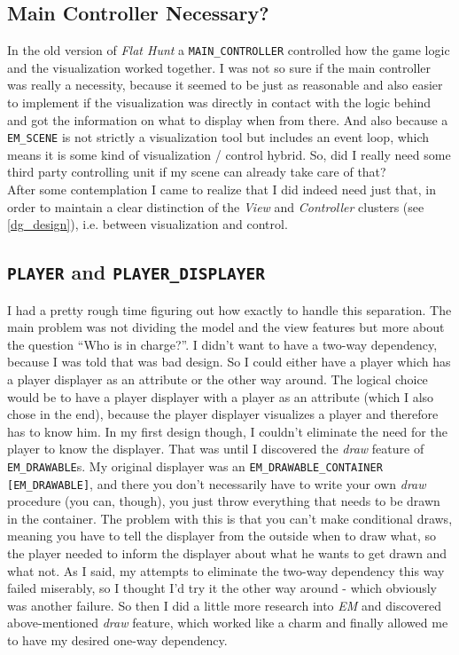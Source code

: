 \subsection{Main Controller Necessary?}
In the old version of \emph{Flat Hunt} a \texttt{MAIN\_CONTROLLER} controlled how the game logic and the visualization worked together. I was not so sure if the main controller was really a necessity, because it seemed to be just as reasonable and also easier to implement if the visualization was directly in contact with the logic behind and got the information on what to display when from there. And also because a \texttt{EM\_SCENE} is not strictly a visualization tool but includes an event loop, which means it is some kind of visualization / control hybrid. So, did I really need some third party controlling unit if my scene can already take care of that?\\
After some contemplation I came to realize that I did indeed need just that, in order to maintain a clear distinction of the \emph{View} and \emph{Controller} clusters (see \autoref{dg_design}), i.e. between visualization and control. 

\subsection{\texttt{PLAYER} and \texttt{PLAYER\_DISPLAYER}}
I had a pretty rough time figuring out how exactly to handle this separation. The main problem was not dividing the model and the view features but more about the question ``Who is in charge?''. I didn't want to have a two-way dependency, because I was told that was bad design. So I could either have a player which has a player displayer as an attribute or the other way around. The logical choice would be to have a player displayer with a player as an attribute (which I also chose in the end), because the player displayer visualizes a player and therefore has to know him. In my first design though, I couldn't eliminate the need for the player to know the displayer. That was until I discovered the \textit{draw} feature of \texttt{EM\_DRAWABLE}s. My original displayer was an \texttt{EM\_DRAWABLE\_CONTAINER [EM\_DRAWABLE]}, and there you don't necessarily have to write your own \textit{draw} procedure (you can, though), you just throw everything that needs to be drawn in the container. The problem with this is that you can't make conditional draws, meaning you have to tell the displayer from the outside when to draw what, so the player needed to inform the displayer about what he wants to get drawn and what not. As I said, my attempts to eliminate the two-way dependency this way failed miserably, so I thought I'd try it the other way around - which obviously was another failure. So then I did a little more research into \emph{EM} and discovered above-mentioned \textit{draw} feature, which worked like a charm and finally allowed me to have my desired one-way dependency.

